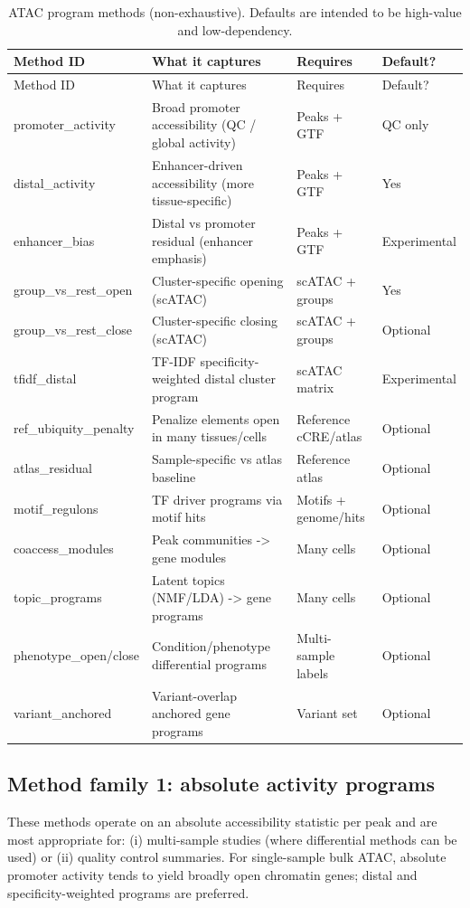 \documentclass[11pt]{article}
\begin{document}
\begin{longtable}{@{}p{2.8cm}p{5.6cm}p{4.0cm}p{1.5cm}@{}}
\caption{ATAC program methods (non-exhaustive). Defaults are intended to be high-value and low-dependency.}
\label{tab:methods_summary}\\
\toprule
Method ID & What it captures & Requires & Default? \\
\midrule
\endfirsthead
\toprule
Method ID & What it captures & Requires & Default? \\
\midrule
\endhead
promoter\_activity & Broad promoter accessibility (QC / global activity) & Peaks + GTF & QC only \\
distal\_activity & Enhancer-driven accessibility (more tissue-specific) & Peaks + GTF & Yes \\
enhancer\_bias & Distal vs promoter residual (enhancer emphasis) & Peaks + GTF & Experimental \\
group\_vs\_rest\_open & Cluster-specific opening (scATAC) & scATAC + groups & Yes \\
group\_vs\_rest\_close & Cluster-specific closing (scATAC) & scATAC + groups & Optional \\
tfidf\_distal & TF-IDF specificity-weighted distal cluster program & scATAC matrix & Experimental \\
ref\_ubiquity\_penalty & Penalize elements open in many tissues/cells & Reference cCRE/atlas & Optional \\
atlas\_residual & Sample-specific vs atlas baseline & Reference atlas & Optional \\
motif\_regulons & TF driver programs via motif hits & Motifs + genome/hits & Optional \\
coaccess\_modules & Peak communities -> gene modules & Many cells & Optional \\
topic\_programs & Latent topics (NMF/LDA) -> gene programs & Many cells & Optional \\
phenotype\_open/close & Condition/phenotype differential programs & Multi-sample labels & Optional \\
variant\_anchored & Variant-overlap anchored gene programs & Variant set & Optional \\
\bottomrule
\end{longtable}

\subsection{Method family 1: absolute activity programs}
These methods operate on an absolute accessibility statistic per peak and are most appropriate for:
(i) multi-sample studies (where differential methods can be used) or
(ii) quality control summaries.
For single-sample bulk ATAC, absolute promoter activity tends to yield broadly open chromatin genes; distal and specificity-weighted programs are preferred.
\end{document}
